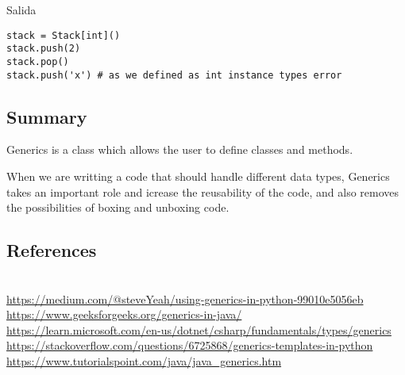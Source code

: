 \documentclass[
	12pt, %
]{fphw}
\begin{document}
Salida
\begin{verbatim}
stack = Stack[int]()
stack.push(2)
stack.pop()
stack.push('x') # as we defined as int instance types error 
\end{verbatim}

\subsection*{Summary}
Generics is a class which allows the user to define classes and methods.

When we are writting a code that should handle different data types, Generics takes an important role and icrease the reusability of the code, and also removes the possibilities of boxing and unboxing code.

\subsection*{References}
\phantom{}\\
\url{https://medium.com/@steveYeah/using-generics-in-python-99010e5056eb}\\
\url{https://www.geeksforgeeks.org/generics-in-java/}\\
\url{https://learn.microsoft.com/en-us/dotnet/csharp/fundamentals/types/generics}\\
\url{https://stackoverflow.com/questions/6725868/generics-templates-in-python}\\
\url{https://www.tutorialspoint.com/java/java_generics.htm}
\end{document}
